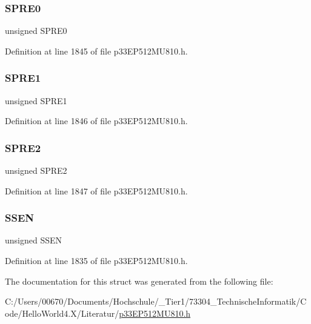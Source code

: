 \subsubsection{\texorpdfstring{S\+P\+R\+E0}{SPRE0}}
{\footnotesize\ttfamily unsigned S\+P\+R\+E0}



Definition at line 1845 of file p33\+E\+P512\+M\+U810.\+h.

\mbox{\label{structtag_s_p_i1_c_o_n1_b_i_t_s_aa10bf0541cfc6de804735f5e3beca089}} 
\subsubsection{\texorpdfstring{S\+P\+R\+E1}{SPRE1}}
{\footnotesize\ttfamily unsigned S\+P\+R\+E1}



Definition at line 1846 of file p33\+E\+P512\+M\+U810.\+h.

\mbox{\label{structtag_s_p_i1_c_o_n1_b_i_t_s_ad98c0587f19b608e8e40e67d2327634c}} 
\subsubsection{\texorpdfstring{S\+P\+R\+E2}{SPRE2}}
{\footnotesize\ttfamily unsigned S\+P\+R\+E2}



Definition at line 1847 of file p33\+E\+P512\+M\+U810.\+h.

\mbox{\label{structtag_s_p_i1_c_o_n1_b_i_t_s_ae77e6e9fafcdae4e5b7f261d00459ade}} 
\subsubsection{\texorpdfstring{S\+S\+EN}{SSEN}}
{\footnotesize\ttfamily unsigned S\+S\+EN}



Definition at line 1835 of file p33\+E\+P512\+M\+U810.\+h.



The documentation for this struct was generated from the following file\+:\begin{DoxyCompactItemize}
\item 
C\+:/\+Users/00670/\+Documents/\+Hochschule/\+\_\+\+Tier1/73304\+\_\+\+Technische\+Informatik/\+Code/\+Hello\+World4.\+X/\+Literatur/\hyperlink{p33_e_p512_m_u810_8h}{p33\+E\+P512\+M\+U810.\+h}\end{DoxyCompactItemize}
